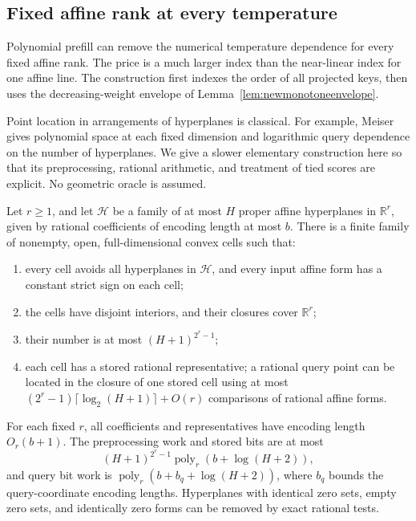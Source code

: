 \subsection{Fixed affine rank at every temperature}
\label{sec:fixedrankalltemp}

Polynomial prefill can remove the numerical temperature dependence
for every fixed affine rank.  The price is a much larger index than
the near-linear index for one affine line.  The construction first
indexes the order of all projected keys, then uses the decreasing-weight
envelope of Lemma~\ref{lem:newmonotoneenvelope}.

Point location in arrangements of hyperplanes is classical.  For
example, Meiser~\cite{meiser1993pointlocation} gives polynomial space
at each fixed dimension and logarithmic query dependence on the
number of hyperplanes.  We give a slower elementary construction
here so that its preprocessing, rational arithmetic, and treatment
of tied scores are explicit.  No geometric oracle is assumed.

\begin{lemma}
\label{lem:elementaryarrangement}
Let $r\ge1$, and let $\mathcal H$ be a family of at most $H$
proper affine hyperplanes in $\mathbb R^r$, given by rational
coefficients of encoding length at most $b$.  There is a finite
family of nonempty, open, full-dimensional convex cells such that:
\begin{enumerate}
 \item every cell avoids all hyperplanes in $\mathcal H$, and every
 input affine form has a constant strict sign on each cell;
 \item the cells have disjoint interiors, and their closures cover
 $\mathbb R^r$;
 \item their number is at most $(H+1)^{2^r-1}$;
 \item each cell has a stored rational representative; a rational
 query point can be located in the closure of one stored cell using
 at most $(2^r-1)\lceil\log_2(H+1)\rceil+O(r)$ comparisons of
 rational affine forms.
\end{enumerate}
For each fixed $r$, all coefficients and representatives have
encoding length $O_r(b+1)$.  The preprocessing work and stored bits
are at most
\[
 (H+1)^{2^r-1}\operatorname{poly}_r(b+\log(H+2)),
\]
and query bit work is
$\operatorname{poly}_r(b+b_q+\log(H+2))$, where $b_q$ bounds the
query-coordinate encoding lengths.  Hyperplanes with identical zero
sets, empty zero sets, and identically zero forms can be removed by
exact rational tests.
\end{lemma}

